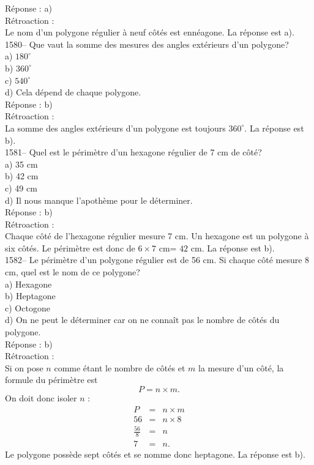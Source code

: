 R\'eponse : a)\\

R\'etroaction :\\
Le nom d'un polygone r\'egulier \`a neuf c\^ot\'es est enn\'eagone.
La r\'eponse est a).
\\

1580-- Que vaut la somme des mesures des angles ext\'erieurs d'un polygone?\\
a) $180^{\circ}$\\
b) $360^{\circ}$\\
c) $540^{\circ}$\\
d) Cela d\'epend de chaque polygone.\\

R\'eponse : b)\\

R\'etroaction :\\
La somme des angles ext\'erieurs d'un polygone est toujours $360^{\circ}.$
La r\'eponse est b).\\

1581-- Quel est le p\'erim\`etre d'un hexagone r\'egulier de 7 cm
de c\^ot\'e?\\
a) 35 cm\\
b) 42 cm\\
c) 49 cm\\
d) Il nous manque l'apoth\`eme pour le d\'eterminer.\\

R\'eponse : b)\\

R\'etroaction :\\
Chaque c\^ot\'e de l'hexagone r\'egulier mesure 7 cm. Un hexagone
est un polygone \`a six c\^ot\'es. Le p\'erim\`etre est donc de $6\times
7{\textrm{ cm}}$= $42{\textrm{ cm}}$. La r\'eponse est b).\\

1582-- Le p\'erim\`etre d'un polygone r\'egulier est de 56 cm. Si chaque
c\^ot\'e mesure 8 cm, quel est le nom de ce polygone?\\
a) Hexagone\\
b) Heptagone\\
c) Octogone\\
d) On ne peut le d\'eterminer car on ne conna\^it pas le nombre de
c\^ot\'es du polygone.\\

R\'eponse : b)\\

R\'etroaction :\\
Si on pose $n$ comme \'etant le nombre de c\^ot\'es et $m$ la mesure
d'un c\^ot\'e, la formule du p\'erim\`etre est $$P=n\times m.$$ On
doit donc isoler $n$ :
\begin{eqnarray*}
P&=&n\times m \\ 56&=&n\times 8 \\ \frac{56}{8}&=&n \\[3mm] 7&=&n.
\end{eqnarray*}
Le polygone poss\`ede sept c\^ot\'es et se nomme donc heptagone. La
r\'eponse est b).\\


